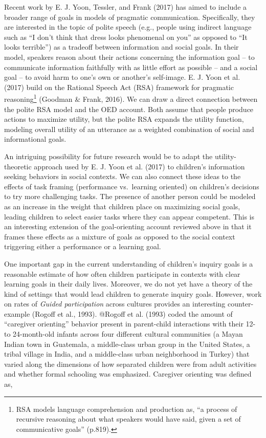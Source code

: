 \documentclass[english,floatsintext,man]{apa6}
\theoremstyle{definition}
\theoremstyle{definition}
\theoremstyle{definition}
\theoremstyle{remark}
\begin{document}
Recent work by E. J. Yoon, Tessler, and Frank (2017) has aimed to
include a broader range of goals in models of pragmatic communication.
Specifically, they are interested in the topic of polite speech (e.g.,
people using indirect language such as \enquote{I don't think that dress
looks phenomenal on you} as opposed to \enquote{It looks terrible}) as a
tradeoff between information and social goals. In their model, speakers
reason about their actions concerning the information goal -- to
communicate information faithfully with as little effort as possible --
and a social goal -- to avoid harm to one's own or another's self-image.
E. J. Yoon et al. (2017) build on the Rational Speech Act (RSA)
framework for pragmatic reasoning\footnote{RSA models language
  comprehension and production as, \enquote{a process of recursive
  reasoning about what speakers would have said, given a set of
  communicative goals} (p.819).} (Goodman \& Frank, 2016). We can draw a
direct connection between the polite RSA model and the OED account. Both
assume that people produce actions to maximize utility, but the polite
RSA expands the utility function, modeling overall utility of an
utterance as a weighted combination of social and informational goals.

An intriguing possibility for future research would be to adapt the
utility-theoretic approach used by E. J. Yoon et al. (2017) to
children's information seeking behaviors in social contexts. We can also
connect these ideas to the effects of task framing (performance
vs.~learning oriented) on children's decisions to try more challenging
tasks. The presence of another person could be modeled as an increase in
the weight that children place on maximizing social goals, leading
children to select easier tasks where they can appear competent. This is
an interesting extension of the goal-orienting account reviewed above in
that it frames these effects as a mixture of goals as opposed to the
social context triggering either a performance or a learning goal.

One important gap in the current understanding of children's inquiry
goals is a reasonable estimate of how often children participate in
contexts with clear learning goals in their daily lives. Moreover, we do
not yet have a theory of the kind of settings that would lead children
to generate inquiry goals. However, work on rates of \emph{Guided
participation} across cultures provides an interesting counter-example
(Rogoff et al., 1993). @Rogoff et al. (1993) coded the amount of
\enquote{caregiver orienting} behavior present in parent-child
interactions with their 12- to 24-month-old infants across four
different cultural communities (a Mayan Indian town in Guatemala, a
middle-class urban group in the United States, a tribal village in
India, and a middle-class urban neighborhood in Turkey) that varied
along the dimensions of how separated children were from adult
activities and whether formal schooling was emphasized. Caregiver
orienting was defined as,
\end{document}
